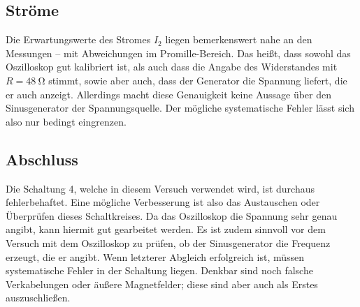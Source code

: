 \subsection{Ströme}
Die Erwartungswerte des Stromes $I_2$ liegen bemerkenswert nahe an den Messungen -- mit Abweichungen im Promille-Bereich. %
Das heißt, dass sowohl das Oszilloskop gut kalibriert ist, als auch dass die Angabe des Widerstandes mit $R = \SI{48}{\ohm}$ stimmt, sowie aber auch, dass der Generator die Spannung liefert, die er auch anzeigt.
Allerdings macht diese Genauigkeit keine Aussage über den Sinusgenerator der Spannungsquelle. Der mögliche systematische Fehler lässt sich also nur bedingt eingrenzen.

\subsection{Abschluss}
Die Schaltung 4, welche in diesem Versuch verwendet wird, ist durchaus fehlerbehaftet. Eine mögliche Verbesserung ist also das Austauschen oder Überprüfen dieses Schaltkreises.
Da das Oszilloskop die Spannung sehr genau angibt, kann hiermit gut gearbeitet werden. Es ist zudem sinnvoll vor dem Versuch %
mit dem Oszilloskop zu prüfen, %
ob der Sinusgenerator die Frequenz erzeugt, die er angibt.
Wenn letzterer Abgleich erfolgreich ist, müssen systematische Fehler in der Schaltung liegen. 
Denkbar sind noch falsche Verkabelungen oder äußere Magnetfelder; diese sind aber auch als Erstes auszuschließen.
\pagebreak


